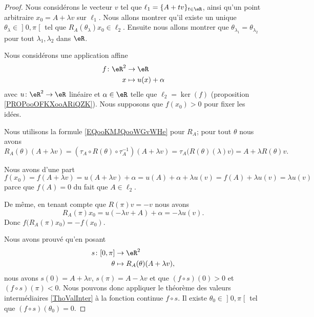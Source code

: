 \begin{proof}
	Nous considérons le vecteur \( v\) tel que \( \ell_1=\{ A+t v \}_{t\in \eR}\), ainsi qu'un point arbitraire \( x_0=A+\lambda v\) sur \( \ell_1\). Nous allons montrer qu'il existe un unique \( \theta_{\lambda}\in \mathopen] 0 , \pi \mathclose[\) tel que \( R_A(\theta_{\lambda})x_0\in \ell_2\). Ensuite nous allons montrer que \( \theta_{\lambda_1}=\theta_{\lambda_2}\) pour tout \( \lambda_1,\lambda_2\) dans \( \eR\).

		Nous considérons une application affine
		\begin{equation}
			\begin{aligned}
				f\colon \eR^2 & \to \eR             \\
				x             & \mapsto u(x)+\alpha
			\end{aligned}
		\end{equation}
		avec \( u\colon \eR^2\to \eR\) linéaire et \( \alpha\in \eR\) telle que \( \ell_2=\ker(f)\) (proposition \ref{PROPooOFKXooARiQZK}). Nous supposons que \( f(x_0)>0\) pour fixer les idées.

		Nous utilisons la formule \eqref{EQooKMJQooWGvWHe} pour \( R_A\); pour tout \( \theta\) nous avons
		\begin{equation}
			R_A(\theta)(A+\lambda v)=(\tau_A\circ R(\theta)\circ \tau_A^{-1})(A+\lambda v)=\tau_A\big( R(\theta)(\lambda)v \big)=A+\lambda R(\theta)v.
		\end{equation}

		Nous avons d'une part
		\begin{equation}
			f(x_0)=f(A+\lambda v)=u(A+\lambda v)+\alpha=u(A)+\alpha+\lambda u(v)=f(A)+\lambda u(v)=\lambda u(v)
		\end{equation}
		parce que \( f(A)=0\) du fait que \( A\in \ell_2\).

		De même, en tenant compte que \( R(\pi)v=-v\) nous avons
		\begin{equation}
			R_A(\pi)x_0=u(-\lambda v+A)+\alpha=-\lambda u(v).
		\end{equation}
		Donc \( f\big( R_A(\pi)x_0 \big)=-f(x_0)\).

		Nous avons prouvé qu'en posant
		\begin{equation}
			\begin{aligned}
				s\colon \mathopen[ 0 , \pi \mathclose] & \to \eR^2                         \\
				\theta                                 & \mapsto R_A(\theta)(A+\lambda v),
			\end{aligned}
		\end{equation}
		nous avons \( s(0)=A+\lambda v\), \( s(\pi)=A-\lambda v\) et que \( (f\circ s)(0)>0\) et \( (f\circ s)(\pi)<0\). Nous pouvons donc appliquer le théorème des valeurs intermédiaires \ref{ThoValInter} à la fonction continue \( f\circ s\). Il existe \( \theta_{0}\in\mathopen] 0 , \pi \mathclose[\) tel que \( (f\circ s)(\theta_{0})=0  \).


\end{proof}
